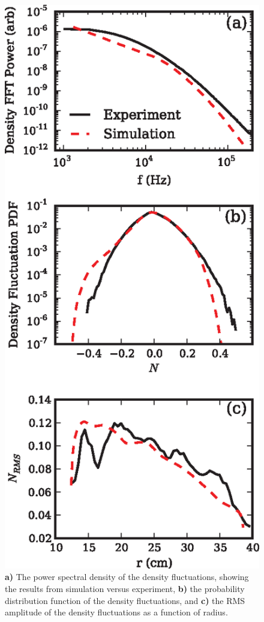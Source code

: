 \documentclass[showpacs,preprintnumbers,amsmath,amssymb,superscriptaddress]{revtex4}
\begin{document}
\begin{figure}[!htbp]
\includegraphics[]{statistics}
\hfil
\caption{\textbf{a)} The power spectral density of the density fluctuations, showing the results from simulation versus experiment, \textbf{b)} the probability distribution function
of the density fluctuations, and \textbf{c)} the RMS amplitude of the density fluctuations as a function of radius.}
\label{validation}
\end{figure}
\end{document}
